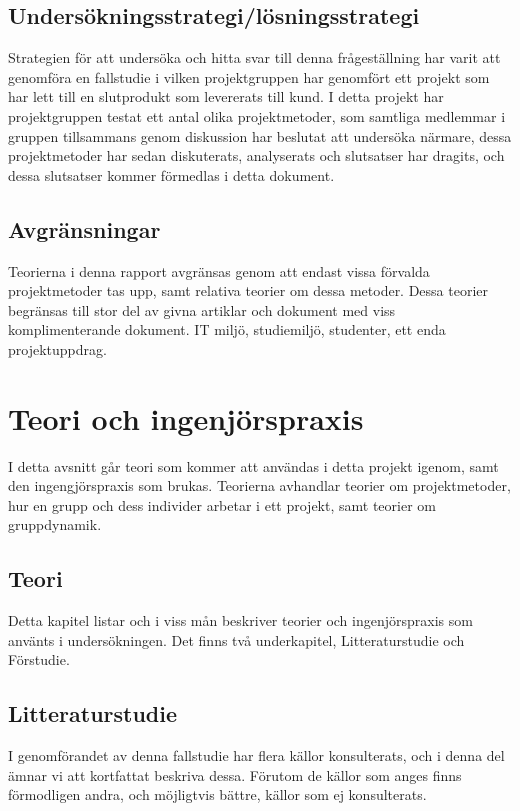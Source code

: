 \documentclass[conference]{IEEEtran}
\begin{document}
\subsection{Undersökningsstrategi/lösningsstrategi}
Strategien för att undersöka och hitta svar till denna frågeställning har varit att genomföra en fallstudie i vilken projektgruppen har genomfört ett projekt som har lett till en slutprodukt som levererats till kund. I detta projekt har projektgruppen testat ett antal olika projektmetoder, som samtliga medlemmar i gruppen tillsammans genom diskussion har beslutat att undersöka närmare, dessa projektmetoder har sedan diskuterats, analyserats och slutsatser har dragits, och dessa slutsatser kommer förmedlas i detta dokument.

\subsection{Avgränsningar}
Teorierna i denna rapport avgränsas genom att endast vissa förvalda projektmetoder tas upp, samt relativa teorier om dessa metoder. Dessa teorier begränsas till stor del av givna artiklar och dokument med viss komplimenterande dokument. IT miljö, studiemiljö, studenter, ett enda projektuppdrag. 

\section{Teori och ingenjörspraxis}
I detta avsnitt går teori som kommer att användas i detta projekt igenom, samt den ingengjörspraxis som brukas. Teorierna avhandlar teorier om projektmetoder, hur en grupp och dess individer arbetar i ett projekt, samt teorier om gruppdynamik.

\subsection{Teori}
Detta kapitel listar och i viss mån beskriver teorier och ingenjörspraxis som använts i undersökningen. Det finns två underkapitel, Litteraturstudie och Förstudie.
\subsection{Litteraturstudie}
I genomförandet av denna fallstudie har flera källor konsulterats, och i denna del ämnar vi att kortfattat beskriva dessa. Förutom de källor som anges finns förmodligen andra, och möjligtvis bättre, källor som ej konsulterats.\\
\\
\end{document}
